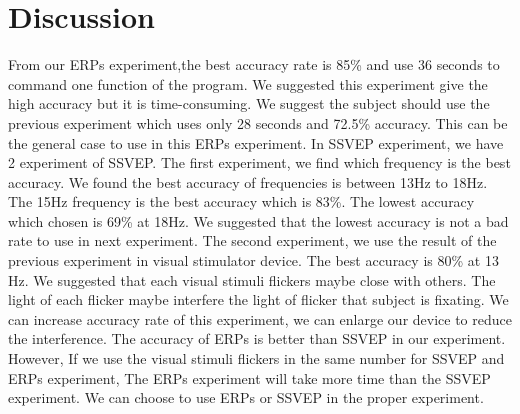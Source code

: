\section{Discussion}
\hspace{1.5cm} From our ERPs experiment,the best accuracy rate is 85\% and use 36 seconds to command one function of the program. We suggested this experiment give the high accuracy but it is time-consuming. We suggest the subject should use the previous experiment which uses only 28 seconds and 72.5\% accuracy. This can be the general case to use in this ERPs experiment.
\hspace{1.5cm} In SSVEP experiment, we have 2 experiment of SSVEP. The first experiment, we find which frequency is the best accuracy. We found the best accuracy of frequencies is between 13Hz to  18Hz. The 15Hz frequency is the best accuracy which is 83\%. The lowest accuracy which chosen is 69\% at 18Hz. We suggested that the lowest accuracy is not a bad rate  to use in next experiment. The second experiment, we use the result of the previous experiment in visual stimulator device. The best accuracy is 80\% at 13 Hz. We suggested that each visual stimuli flickers maybe close with others. The light of each flicker maybe interfere the light of flicker that subject is fixating. We can increase accuracy rate of this experiment, we can enlarge our device to reduce the interference. The accuracy of ERPs is better than SSVEP in our experiment. However, If we use the visual stimuli flickers in the same number for SSVEP and ERPs experiment, The ERPs experiment will take more time than the SSVEP experiment. We can choose to use ERPs or SSVEP in the proper experiment.

